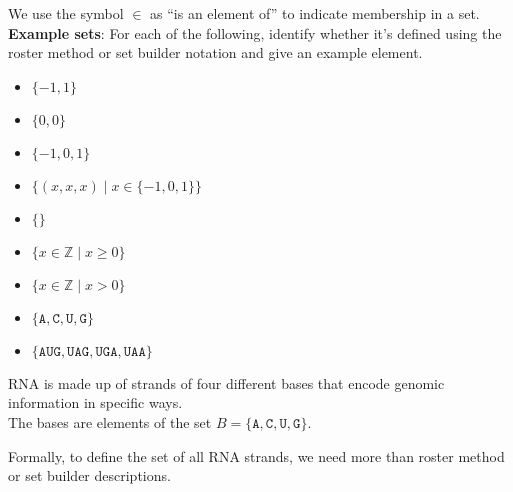 \documentclass[12pt, oneside]{article}
\newcommand{\A}[0]{\texttt{A}}
\newcommand{\C}[0]{\texttt{C}}
\newcommand{\G}[0]{\texttt{G}}
\newcommand{\U}[0]{\texttt{U}}
\begin{document}
We use the symbol $\in$ as ``is an element of'' to indicate membership in a set.\\


{\bf Example sets}: For each of the following, identify whether it's defined using the roster method
or set builder notation and give an example element.
\begin{itemize}
    \item[]$\{ -1, 1\}$\\
    \item[]$\{0, 0 \}$\\
    \item[]$\{-1, 0, 1 \}$\\
    \item[]$\{(x,x,x) \mid x \in \{-1,0,1\} \}$\\
    \item[]$\{ \}$\\
    \item[]$\{ x \in \mathbb{Z} \mid x \geq 0 \}$\\
    \item[]$\{ x \in \mathbb{Z}  \mid x > 0 \}$\\
    \item[]$\{\A,\C,\U,\G\}$ \\
    \item[]$\{\A\U\G, \U\A\G, \U\G\A, \U\A\A \}$\\
\end{itemize}
 

RNA is made up of strands of four different bases that encode genomic information
in specific ways.\\
The bases are elements of the set 
$B  = \{\A, \C, \U, \G \}$.


Formally, to define the set of all RNA strands, we need more than roster
method or set builder descriptions. 

\end{document}

